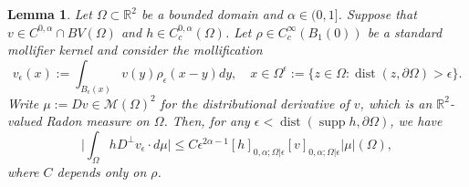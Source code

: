 \documentclass[12pt]{article}
\newcommand{\R}{\mathbb{R}}
\newcommand{\dist}{\operatorname{dist}}
\theoremstyle{plain}
\newtheorem{lemma}[theorem]{Lemma}
\numberwithin{equation}{section}
\begin{document}
\begin{lemma} \label{lemma:cancellation}
Let $\Omega \subset \R^2$ be a bounded domain and $\alpha \in (0,1]$. Suppose that $v \in C^{0,\alpha} \cap BV(\Omega)$ and $h \in C_c^{0,\alpha}(\Omega)$. Let $\rho \in C^\infty_c(B_1(0))$ be a standard mollifier kernel and consider the mollification
\begin{equation*}
  v_\epsilon(x) := \int_{B_\epsilon(x)} v(y) \rho_\epsilon(x-y) dy, \quad x \in \Omega^\epsilon := \{z \in \Omega : \dist(z,\partial \Omega) > \epsilon\}.
\end{equation*}
Write $\mu := Dv \in \mathcal{M}(\Omega)^2$ for the distributional derivative of $v$, which is an $\R^2$-valued Radon measure on $\Omega$. Then, for any $\epsilon < \dist(\operatorname{supp} h,\partial\Omega)$, we have
\begin{equation} \label{eq:wedge_cancellation}
    \Big| \int_\Omega h D^\perp v_\epsilon \cdot d\mu \Big| \leq C \epsilon^{2\alpha-1} [h]_{0, \alpha; \Omega | \epsilon} [v]_{0,\alpha; \Omega | \epsilon}|\mu|(\Omega),
\end{equation}
where $C$ depends only on $\rho$.
\end{lemma}
\end{document}
